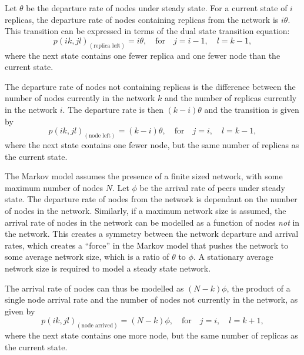 Let $\theta$ be the departure rate of nodes under steady state. For a current state of $i$ replicas, the departure rate of nodes containing replicas from the network is $i\theta$. This transition can be expressed in terms of the dual state transition equation:
%
\begin{equation} \label{eq_rep_left}
    p(i k,j l)_{(\textrm{replica left})} = i\theta,\quad\textrm{for}\quad j = i - 1,\quad l = k - 1,
\end{equation}
%
where the next state contains one fewer replica and one fewer node than the current state.

The departure rate of nodes not containing replicas is the difference between the number of nodes currently in the network $k$ and the number of replicas currently in the network $i$. The departure rate is then $(k - i)\theta$ and the transition is given by
%
\begin{equation} \label{eq_node_left}
    p(i k,j l)_{(\textrm{node left})} = (k - i)\theta,\quad\textrm{for}\quad j = i,\quad l = k - 1,
\end{equation}
%
where the next state contains one fewer node, but the same number of replicas as the current state.

The Markov model assumes the presence of a finite sized network, with some maximum number of nodes $N$. Let $\phi$ be the arrival rate of peers under steady state. The departure rate of nodes from the network is dependant on the number of nodes in the network. Similarly, if a maximum network size is assumed, the arrival rate of nodes in the network can be modelled as a function of nodes \emph{not} in the network. This creates a symmetry between the network departure and arrival rates, which creates a ``force'' in the Markov model that pushes the network to some average network size, which is a ratio of $\theta$ to $\phi$. A stationary average network size is required to model a steady state network.

The arrival rate of nodes can thus be modelled as $(N - k)\phi$, the product of a single node arrival rate and the number of nodes not currently in the network, as given by
%
\begin{equation} \label{eq_node_arrived}
    p(i k,j l)_{(\textrm{node arrived})} = (N - k)\phi,\quad\textrm{for}\quad j = i,\quad l = k + 1,
\end{equation}
%
where the next state contains one more node, but the same number of replicas as the current state.


